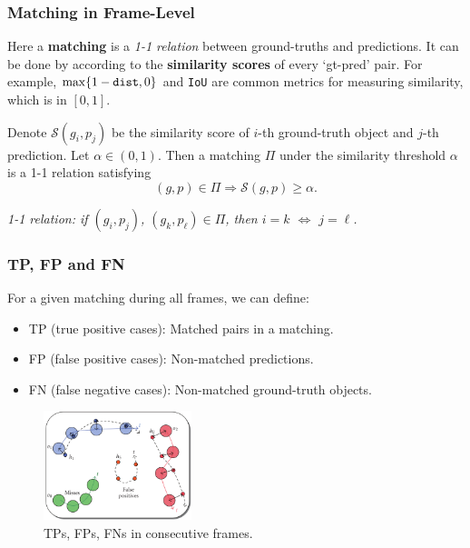 \documentclass[slidestop, mathserif]{beamer}
\begin{document}
\begin{frame}
    \frametitle{Matching in Frame-Level}

    Here a {\bf matching} is a \emph{1-1 relation} between ground-truths
    and predictions.
    It can be done by according to the {\bf similarity scores} of every `gt-pred' pair.
    For example, $\max\{1-\text{\tt dist}, 0\}$ and {\tt IoU} are common metrics for measuring
    similarity, which is in $[0,1]$.

    \quad

    Denote $\mathcal S(g_i, p_j)$ be the similarity score of $i$-th ground-truth object
    and $j$-th prediction. Let $\alpha\in(0,1)$.
    Then a matching $\Pi$ under the similarity threshold $\alpha$ is a 1-1 relation satisfying
    \[
        (g,p) \in \Pi \Rightarrow \mathcal S(g, p) \geq \alpha.
    \]

    \vspace{5pt}

    \emph{1-1 relation: if $(g_i, p_j)$, $(g_k, p_\ell)\in \Pi$,
    then $i=k$ $\Leftrightarrow$ $j=\ell$.}

\end{frame}

\begin{frame}
    \frametitle{TP, FP and FN}

    For a given matching during all frames, we can define:
    \begin{itemize} \itemsep = 2pt
    \item TP (true positive cases): Matched pairs in a matching.
    \item FP (false positive cases): Non-matched predictions.
    \item FN (false negative cases): Non-matched ground-truth objects.
    \end{itemize}

    \begin{figure}
        \includegraphics[height=90pt]{pics/fig2.png}
        \caption{TPs, FPs, FNs in consecutive frames.}
    \end{figure}

\end{frame}
\end{document}
